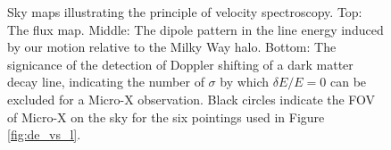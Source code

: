 \documentclass[aps,prd,10pt,twocolumn,superscriptaddress,showpacs]{revtex4-1}
\begin{document}
\begin{figure}[h!]
\begin{subfigure}[b]{1.0\columnwidth}
\end{subfigure}
\caption{Sky maps illustrating the principle of velocity spectroscopy. Top: The flux map. Middle:
	The dipole pattern in the line energy induced by our motion relative to the Milky Way halo.
	Bottom: The signicance of the detection of Doppler shifting of a dark matter decay line,
indicating the number of $\sigma$ by which $\delta E/E=0$ can be excluded for a Micro-X
observation. Black circles indicate the
FOV of Micro-X on the sky for the six pointings used in Figure \ref{fig:de_vs_l}. }
\label{fig:skymaps}
\end{figure}



\end{document}
